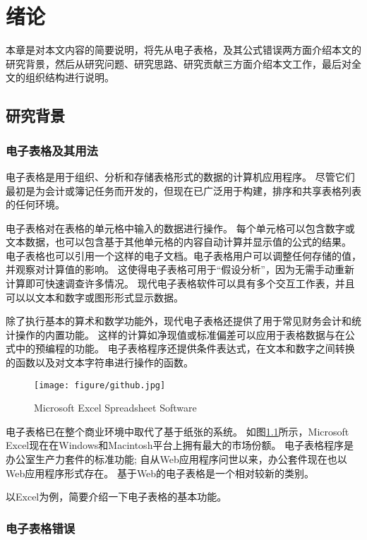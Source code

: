 \chapter{绪论}\label{introduction}

本章是对本文内容的简要说明，将先从电子表格，及其公式错误两方面介绍本文的研究背景，然后从研究问题、研究思路、研究贡献三方面介绍本文工作，最后对全文的组织结构进行说明。

\section{研究背景}

\subsection{电子表格及其用法}
电子表格\cite{BHR12}是用于组织、分析和存储表格形式的数据的计算机应用程序。
尽管它们最初是为会计或簿记任务而开发的，但现在已广泛用于构建，排序和共享表格列表的任何环境。

电子表格对在表格的单元格中输入的数据进行操作。
每个单元格可以包含数字或文本数据，也可以包含基于其他单元格的内容自动计算并显示值的公式的结果。
电子表格也可以引用一个这样的电子文档。电子表格用户可以调整任何存储的值，并观察对计算值的影响。
这使得电子表格可用于“假设分析”，因为无需手动重新计算即可快速调查许多情况。
现代电子表格软件可以具有多个交互工作表，并且可以以文本和数字或图形形式显示数据。

除了执行基本的算术和数学功能外，现代电子表格还提供了用于常见财务会计和统计操作的内置功能。
这样的计算如净现值或标准偏差可以应用于表格数据与在公式中的预编程的功能。
电子表格程序还提供条件表达式，在文本和数字之间转换的函数以及对文本字符串进行操作的函数。

\begin{figure}[t!]
    \centering
    \texttt{[image: figure/github.jpg]}
    \caption{Microsoft Excel Spreadsheet Software}   
    \label{fig:1} 
\end{figure}

电子表格已在整个商业环境中取代了基于纸张的系统。
如图\ref{fig:1}所示，Microsoft Excel现在在Windows和Macintosh平台上拥有最大的市场份额。
电子表格程序是办公室生产力套件的标准功能; 自从Web应用程序问世以来，办公套件现在也以Web应用程序形式存在。
基于Web的电子表格是一个相对较新的类别。

以Excel为例，简要介绍一下电子表格的基本功能。

\subsection{电子表格错误}

